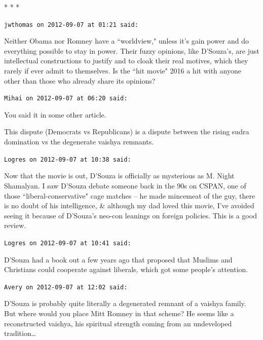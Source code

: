 
\begin{center}* * *\end{center}

\begin{footnotesize}\begin{sffamily}



\texttt{jwthomas on 2012-09-07 at 01:21 said: }

Neither Obama nor Romney have a ``worldview," unless it's gain power and do everything possible to stay in power. Their fuzzy opinions, like D'Souza's, are just intellectual constructions to justify and to cloak their real motives, which they rarely if ever admit to themselves. Is the ``hit movie" 2016 a hit with anyone other than those who already share its opinions?


\hfill

\texttt{Mihai on 2012-09-07 at 06:20 said: }

You said it in some other article.

This dispute (Democrats vs Republicans) is a dispute between the rising sudra domination vs the degenerate vaishya remnants.


\hfill

\texttt{Logres on 2012-09-07 at 10:38 said: }

Now that the movie is out, D'Souza is officially as mysterious as M. Night Shamalyan. I saw D'Souza debate someone back in the 90s on CSPAN, one of those ``liberal-conservative" cage matches – he made mincemeat of the guy, there is no doubt of his intelligence, \& although my dad loved this movie, I've avoided seeing it because of D'Souza's neo-con leanings on foreign policies. This is a good review.


\hfill

\texttt{Logres on 2012-09-07 at 10:41 said: }

D'Souza had a book out a few years ago that proposed that Muslims and Christians could cooperate against liberals, which got some people's attention.


\hfill

\texttt{Avery on 2012-09-07 at 12:02 said: }

D'Souza is probably quite literally a degenerated remnant of a vaishya family. But where would you place Mitt Romney in that scheme? He seems like a reconstructed vaishya, his spiritual strength coming from an undeveloped tradition…



\end{sffamily}
\end{footnotesize}
